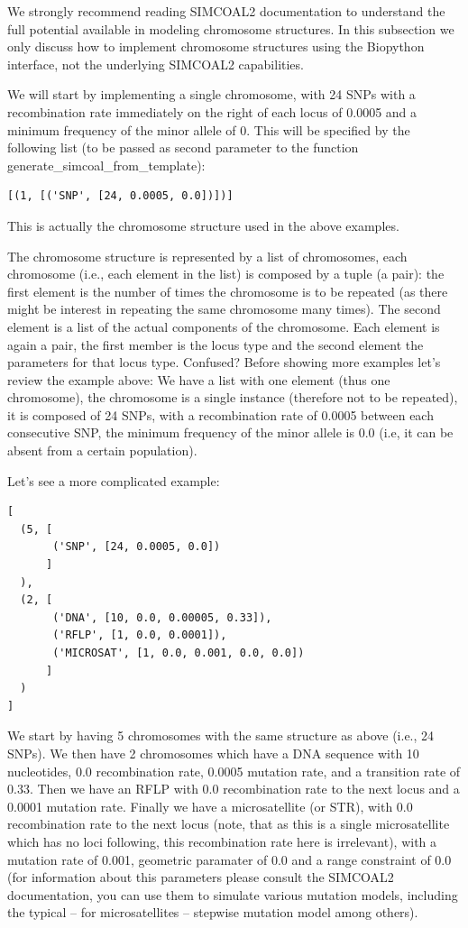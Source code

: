 \documentclass{report}
\begin{document}
We strongly recommend reading SIMCOAL2 documentation to understand the full potential
available in modeling chromosome structures. In this subsection we only discuss how
to implement chromosome structures using the Biopython interface, not the underlying
SIMCOAL2 capabilities.

We will start by implementing a single chromosome, with 24 SNPs with
a recombination rate immediately on the right of each locus of 0.0005 and a
minimum frequency of the minor allele of 0. This will be specified by the
following list (to be passed as second parameter to the function
generate\_simcoal\_from\_template):

\begin{verbatim}
[(1, [('SNP', [24, 0.0005, 0.0])])]
\end{verbatim}

This is actually the chromosome structure used in the above examples.


The chromosome structure is represented by a list of chromosomes,
each chromosome (i.e., each element in the list)
is composed by a tuple (a pair): the first element
is the number of times the chromosome is to be repeated (as there
might be interest in repeating the same chromosome many times).
The second element is a list of the actual components of the chromosome.
Each element is again a pair, the first member is the locus type and
the second element the parameters for that locus type. Confused?
Before showing more examples let's review the example above: We have
a list with one element (thus one chromosome), the chromosome is
a single instance (therefore not to be repeated), it is composed
of 24 SNPs, with a recombination rate of 0.0005 between each
consecutive SNP, the minimum frequency of the minor allele is
0.0 (i.e, it can be absent from a certain population).

Let's see a more complicated example:

\begin{verbatim}
[
  (5, [
       ('SNP', [24, 0.0005, 0.0])
      ]
  ),
  (2, [
       ('DNA', [10, 0.0, 0.00005, 0.33]),
       ('RFLP', [1, 0.0, 0.0001]),
       ('MICROSAT', [1, 0.0, 0.001, 0.0, 0.0])
      ]
  )
]
\end{verbatim}

We start by having 5 chromosomes with the same structure as
above (i.e., 24 SNPs). We then have 2 chromosomes which
have a DNA sequence with 10 nucleotides, 0.0 recombination rate,
0.0005 mutation rate, and a transition rate of 0.33. Then we
have an RFLP with 0.0 recombination rate to the next locus and
a 0.0001 mutation rate. Finally we have a microsatellite (or STR),
with 0.0 recombination rate to the next locus (note, that as this
is a single microsatellite which has no loci following, this
recombination rate here is irrelevant), with a mutation rate
of 0.001, geometric paramater of 0.0 and a range constraint
of 0.0 (for information about this parameters please consult
the SIMCOAL2 documentation, you can use them to simulate
various mutation models, including the typical  -- for microsatellites --
stepwise mutation model among others).
\end{document}
